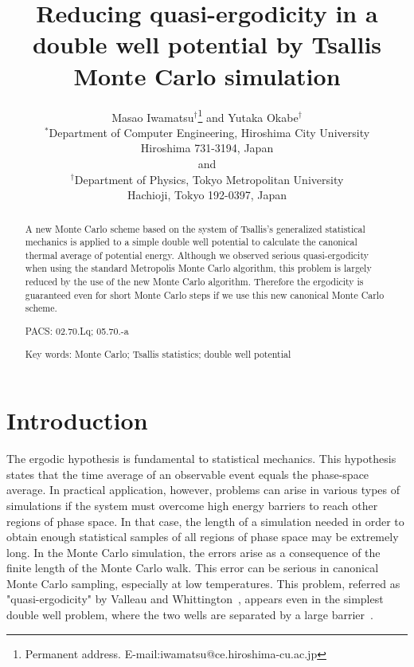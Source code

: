 

\title{ Reducing quasi-ergodicity in a double well potential by Tsallis Monte Carlo simulation }

\author{ Masao Iwamatsu$^{\dagger}$\thanks{Permanent address.  E-mail:iwamatsu@ce.hiroshima-cu.ac.jp} and Yutaka Okabe$^{\dagger}$ \\$^{*}$Department of Computer Engineering, Hiroshima City University\\  Hiroshima 731-3194, Japan\\ and\\ $^{\dagger}$Department of Physics, Tokyo Metropolitan University\\  Hachioji, Tokyo 192-0397, Japan }

\date
{
}

\maketitle

\begin{abstract}
A new Monte Carlo scheme based on the system of Tsallis's generalized
statistical mechanics is applied to a simple double well potential
to calculate the canonical thermal average of potential energy.
Although we observed serious quasi-ergodicity when using the standard
Metropolis Monte Carlo algorithm, this problem is largely reduced by
the use of the new Monte Carlo algorithm. Therefore the ergodicity
is guaranteed even for short Monte Carlo steps if we use this new
canonical Monte Carlo scheme. \\

\begin{flushleft}

PACS: 02.70.Lq; 05.70.-a

Key words: Monte Carlo; Tsallis statistics; double well potential\\

\end{flushleft}
\end{abstract}

\newpage
\section{Introduction}

The ergodic hypothesis is fundamental to statistical mechanics.
This hypothesis states that the time average of an observable
event equals the phase-space average. In practical application,
however, problems can arise in various types of simulations
if the system must overcome high energy barriers to reach other
regions of phase space. In that case, the length of a simulation
needed in order to obtain enough statistical samples of all
regions of phase space may be extremely long. In the Monte Carlo
simulation, the errors arise as a consequence of the finite
length of the Monte Carlo walk. This error can be serious in
canonical Monte Carlo sampling, especially at low temperatures.
This problem, referred as "quasi-ergodicity" by Valleau and
Whittington~\cite{VW}, appears even in the simplest double well
problem, where the two wells are separated by a large
barrier~\cite{FFD}.

